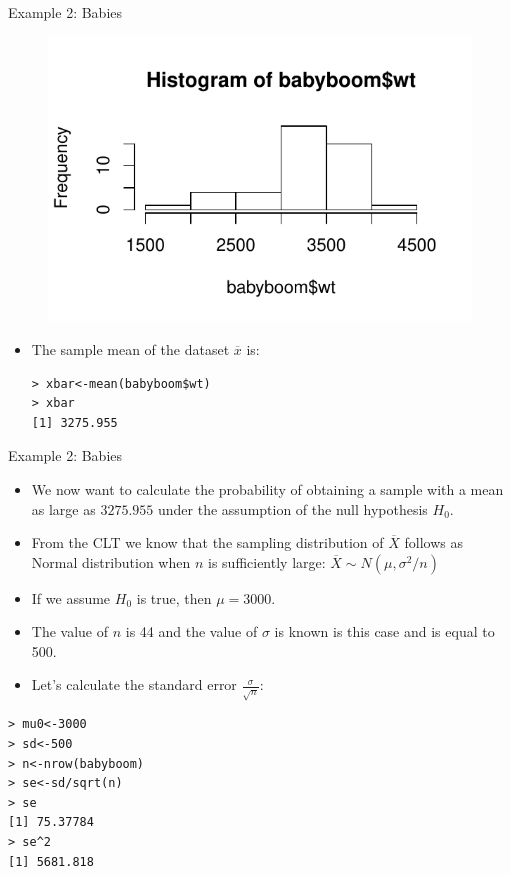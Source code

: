 \documentclass[handout]{beamer}
\begin{document}
\begin{frame}[fragile]{Example 2: Babies}
\scriptsize{

 \begin{figure}[h!]
	\centering
	\includegraphics[scale=0.6]{pics/babyhist.pdf}
\end{figure}

\begin{itemize}
 \item The sample mean of the dataset $\overline{x}$ is: 
 \begin{verbatim}
> xbar<-mean(babyboom$wt)
> xbar
[1] 3275.955
 \end{verbatim}
 
\end{itemize}


} 
\end{frame}


\begin{frame}[fragile]{Example 2: Babies}
\scriptsize{

\begin{itemize}
 \item We now want to calculate the probability of obtaining a sample with a mean as large as $3275.955$ under the assumption of the null hypothesis $H_0$.
 \item From the CLT we know that the sampling distribution of $\overline{X}$ follows as Normal distribution when $n$ is sufficiently large: $\overline{X} \sim N(\mu, \sigma^2/n)$
 \item If we assume $H_0$ is true, then $\mu=3000$.
 \item The value of $n$ is 44 and the value of $\sigma$ is known is this case and is equal to 500. 
 \item Let's calculate the standard error $\frac{\sigma}{\sqrt{n}}$:
\end{itemize}

\begin{verbatim}
> mu0<-3000
> sd<-500
> n<-nrow(babyboom)
> se<-sd/sqrt(n)
> se
[1] 75.37784
> se^2
[1] 5681.818
\end{verbatim}



} 
\end{frame}
\end{document}
